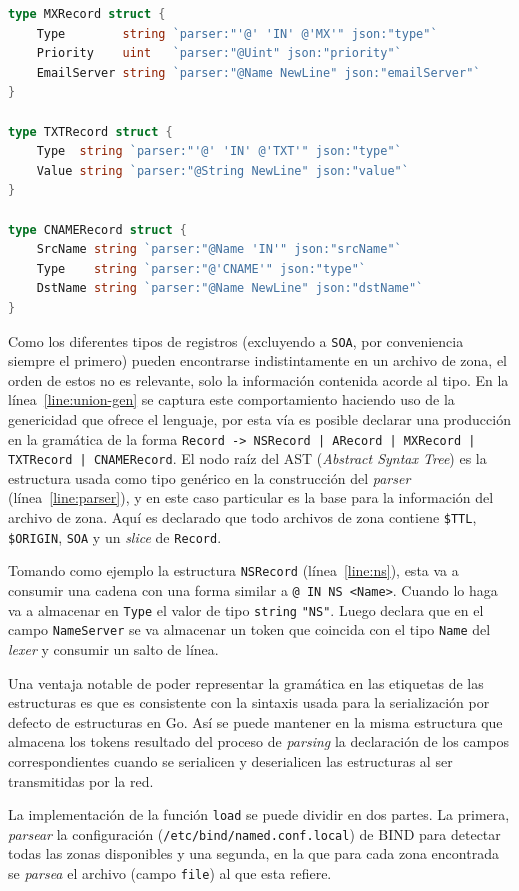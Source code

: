 \begin{lstlisting}[frame=single, language=Go, escapechar=!, caption=Implementación en Go del \textit{parser} para los archivos de zona.]
type MXRecord struct {
	Type        string `parser:"'@' 'IN' @'MX'" json:"type"`
	Priority    uint   `parser:"@Uint" json:"priority"`
	EmailServer string `parser:"@Name NewLine" json:"emailServer"`
}

type TXTRecord struct {
	Type  string `parser:"'@' 'IN' @'TXT'" json:"type"`
	Value string `parser:"@String NewLine" json:"value"`
}

type CNAMERecord struct {
	SrcName string `parser:"@Name 'IN'" json:"srcName"`
	Type    string `parser:"@'CNAME'" json:"type"`
	DstName string `parser:"@Name NewLine" json:"dstName"`
}
\end{lstlisting}

Como los diferentes tipos de registros (excluyendo a \verb|SOA|, por conveniencia siempre el primero) pueden encontrarse indistintamente en un archivo de zona, el orden de estos no es relevante, solo la información contenida acorde al tipo. En la línea~\ref{line:union-gen} se captura este comportamiento haciendo uso de la genericidad que ofrece el lenguaje, por esta vía es posible declarar una producción en la gramática de la forma \verb+Record -> NSRecord | ARecord | MXRecord | TXTRecord | CNAMERecord+. El nodo raíz del AST (\textit{Abstract Syntax Tree}) es la estructura usada como tipo genérico en la construcción del \textit{parser} (línea~\ref{line:parser}), y en este caso particular es la base para la información del archivo de zona. Aquí es declarado que todo archivos de zona contiene \verb+$TTL+, \verb|$ORIGIN|, \verb|SOA| y un \textit{slice} de \verb|Record|.

Tomando como ejemplo la estructura \verb+NSRecord+ (línea~\ref{line:ns}), esta va a consumir una cadena con una forma similar a \verb|@ IN NS <Name>|. Cuando lo haga va a almacenar en \verb|Type| el valor de tipo \verb|string| \verb|"NS"|. Luego declara que en el campo \verb+NameServer+ se va almacenar un token que coincida con el tipo \verb+Name+ del \textit{lexer} y consumir un salto de línea.

Una ventaja notable de poder representar la gramática en las etiquetas de las estructuras es que es consistente con la sintaxis usada para la serialización por defecto de estructuras en Go. Así se puede mantener en la misma estructura que almacena los tokens resultado del proceso de \textit{parsing} la declaración de los campos correspondientes cuando se serialicen y deserialicen las estructuras al ser transmitidas por la red.

La implementación de la función \verb|load| se puede dividir en dos partes. La primera, \textit{parsear} la configuración (\verb|/etc/bind/named.conf.local|) de BIND para detectar todas las zonas disponibles y una segunda, en la que para cada zona encontrada se \textit{parsea} el archivo (campo \verb|file|) al que esta refiere.


